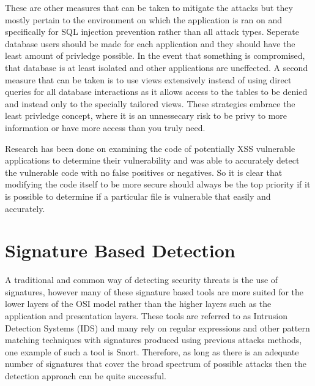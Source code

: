 These are other measures that can be taken to mitigate the attacks but they mostly pertain to the environment on which the application is ran on and specifically for SQL injection prevention rather than all attack types.  Seperate database users should be made for each application and they should have the least amount of privledge possible.  In the event that something is compromised, that database is at least isolated and other applications are uneffected.  A second measure that can be taken is to use views extensively instead of using direct queries for all database interactions as it allows access to the tables to be denied and instead only to the specially tailored views.  These strategies embrace the least privledge concept, where it is an unnessecary risk to be privy to more information or have more access than you truly need. \cite{owaspSQLPrevention}

Research has been done on examining the code of potentially XSS vulnerable applications to determine their vulnerability and was able to accurately detect the vulnerable code with no false positives or negatives.  So it is clear that modifying the code itself to be more secure should always be the top priority if it is possible to determine if a particular file is vulnerable that easily and accurately. \cite{xssdm}

\section{Signature Based Detection} \label{sec:sigDetection}

A traditional and common way of detecting security threats is the use of signatures, however many of these signature based tools are more suited for the lower layers of the OSI model rather than the higher layers such as the application and presentation layers.  These tools are referred to as Intrusion Detection Systems (IDS) and many rely on regular expressions and other pattern matching techniques with signatures produced using previous attacks methods, one example of such a tool is Snort. \cite{mainPaper}  Therefore, as long as there is an adequate number of signatures that cover the broad spectrum of possible attacks then the detection approach can be quite successful.  

